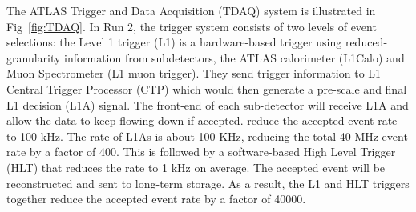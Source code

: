 The ATLAS Trigger and Data Acquisition (TDAQ) system \cite{Ruiz-Martinez:2133909} is illustrated in Fig~\ref{fig:TDAQ}. In Run 2, the trigger system consists of two levels of event selections: the Level 1 trigger (L1) is 
a hardware-based trigger using reduced-granularity information from subdetectors, the ATLAS calorimeter (L1Calo) and Muon Spectrometer (L1 muon trigger).
They send trigger information to L1 Central Trigger Processor (CTP) which would then generate a pre-scale and final L1 decision (L1A) signal. 
The front-end of each sub-detector will receive L1A and allow the data to keep flowing down if accepted. reduce the accepted event rate to 100 kHz. 
The rate of L1As is about 100 KHz, reducing the total 40 MHz event rate by a factor of 400. This is followed by a software-based High Level Trigger (HLT) that reduces the rate to 1 kHz on average. The accepted event will be reconstructed and sent to long-term storage. As a result, the L1 and HLT triggers together reduce the accepted event rate by a factor of 40000.

